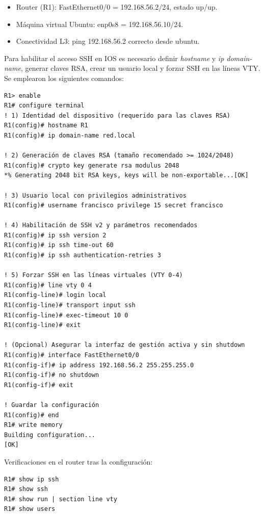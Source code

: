 \begin{itemize}
  \item Router (R1): FastEthernet0/0 = 192.168.56.2/24, estado up/up.
  \item Máquina virtual Ubuntu: enp0s8 = 192.168.56.10/24.
  \item Conectividad L3: ping 192.168.56.2 correcto desde ubuntu.
\end{itemize}

Para habilitar el acceso SSH en IOS es necesario definir \textit{hostname} y \textit{ip domain-name}, generar claves RSA, crear un usuario local y forzar SSH en las líneas VTY. Se emplearon los siguientes comandos:


\begin{lstlisting}[language={},caption={Configuración IOS para habilitar SSH},label={lst:ssh-ios-config}]
R1> enable
R1# configure terminal
! 1) Identidad del dispositivo (requerido para las claves RSA)
R1(config)# hostname R1
R1(config)# ip domain-name red.local

! 2) Generación de claves RSA (tamaño recomendado >= 1024/2048)
R1(config)# crypto key generate rsa modulus 2048
*% Generating 2048 bit RSA keys, keys will be non-exportable...[OK]

! 3) Usuario local con privilegios administrativos
R1(config)# username francisco privilege 15 secret francisco

! 4) Habilitación de SSH v2 y parámetros recomendados
R1(config)# ip ssh version 2
R1(config)# ip ssh time-out 60
R1(config)# ip ssh authentication-retries 3

! 5) Forzar SSH en las líneas virtuales (VTY 0-4)
R1(config)# line vty 0 4
R1(config-line)# login local
R1(config-line)# transport input ssh
R1(config-line)# exec-timeout 10 0
R1(config-line)# exit

! (Opcional) Asegurar la interfaz de gestión activa y sin shutdown
R1(config)# interface FastEthernet0/0
R1(config-if)# ip address 192.168.56.2 255.255.255.0
R1(config-if)# no shutdown
R1(config-if)# exit

! Guardar la configuración
R1(config)# end
R1# write memory
Building configuration...
[OK]
\end{lstlisting}

\noindent
Verificaciones en el router tras la configuración:
\begin{lstlisting}[language={},caption={Comprobaciones rápidas en el router},label={lst:ssh-ios-show}]
R1# show ip ssh
R1# show ssh
R1# show run | section line vty
R1# show users
\end{lstlisting}

